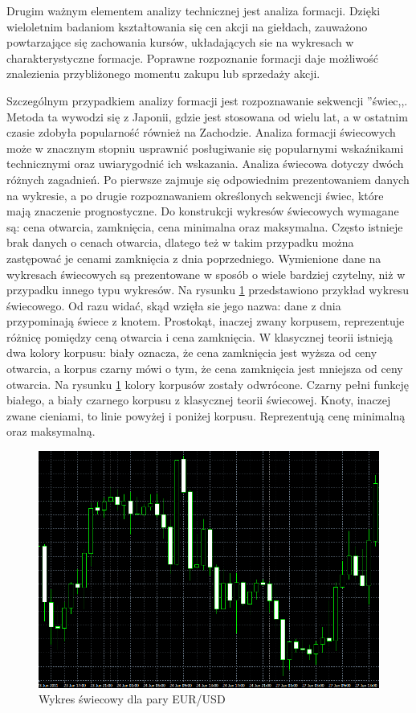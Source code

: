 \documentclass[pdflatex,11pt]{aghdpl}
\begin{document}
Drugim ważnym elementem analizy technicznej jest analiza formacji. Dzięki wieloletnim badaniom kształtowania się cen akcji na giełdach, zauważono powtarzające się zachowania kursów, układających sie na wykresach w charakterystyczne formacje. Poprawne rozpoznanie formacji daje możliwość znalezienia przybliżonego momentu zakupu lub sprzedaży akcji. 

Szczególnym przypadkiem analizy formacji jest rozpoznawanie sekwencji ''świec,,. Metoda ta wywodzi się z Japonii, gdzie jest stosowana od wielu lat, a w ostatnim czasie zdobyła popularność również na Zachodzie. Analiza formacji świecowych może w znacznym stopniu usprawnić posługiwanie się popularnymi wskaźnikami technicznymi oraz uwiarygodnić ich wskazania\cite{3}. Analiza świecowa dotyczy dwóch różnych zagadnień. Po pierwsze zajmuje się odpowiednim prezentowaniem danych na wykresie, a po drugie rozpoznawaniem określonych sekwencji świec, które mają znaczenie prognostyczne. Do konstrukcji wykresów świecowych wymagane są: cena otwarcia, zamknięcia, cena minimalna oraz maksymalna. Często istnieje brak danych o cenach otwarcia, dlatego też w takim przypadku można zastępować je cenami zamknięcia z dnia poprzedniego. Wymienione dane na wykresach świecowych są prezentowane w sposób o wiele bardziej czytelny, niż w przypadku innego typu wykresów. Na rysunku \ref{swieca} przedstawiono przykład wykresu świecowego. Od razu widać, skąd wzięła sie jego nazwa: dane z dnia przypominają świece z knotem. Prostokąt, inaczej zwany korpusem, reprezentuje różnicę pomiędzy ceną otwarcia i cena zamknięcia. W klasycznej teorii istnieją dwa kolory korpusu: biały oznacza, że cena zamknięcia jest wyższa od ceny otwarcia, a korpus czarny mówi o tym, że cena zamknięcia jest mniejsza od ceny otwarcia. Na rysunku \ref{swieca} kolory korpusów zostały odwrócone. Czarny pełni funkcję białego, a biały czarnego korpusu z klasycznej teorii świecowej. Knoty, inaczej zwane cieniami, to linie powyżej i poniżej korpusu. Reprezentują cenę minimalną oraz maksymalną. 
\begin{figure}[ht]
\begin{center}
\includegraphics[width=15cm]{candles.png}
\caption{Wykres świecowy dla pary EUR/USD}
\label{swieca}
\end{center}
\end{figure} 
\end{document}
